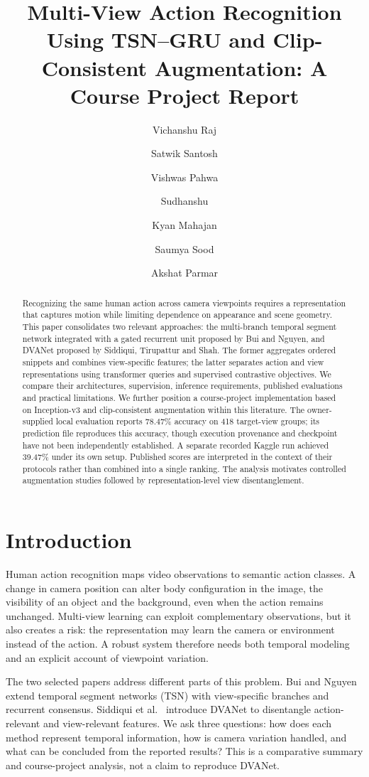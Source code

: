 \documentclass[runningheads]{llncs}
\title{Multi-View Action Recognition Using TSN--GRU and Clip-Consistent Augmentation: A Course Project Report}
\author{Vichanshu Raj \and Satwik Santosh \and Vishwas Pahwa \and Sudhanshu \and Kyan Mahajan \and Saumya Sood \and Akshat Parmar}
\institute{Image and Video Processing Course Project, Group 19}
\begin{document}
\maketitle
\begin{abstract}
Recognizing the same human action across camera viewpoints requires a representation that captures motion while limiting dependence on appearance and scene geometry. This paper consolidates two relevant approaches: the multi-branch temporal segment network integrated with a gated recurrent unit proposed by Bui and Nguyen, and DVANet proposed by Siddiqui, Tirupattur and Shah. The former aggregates ordered snippets and combines view-specific features; the latter separates action and view representations using transformer queries and supervised contrastive objectives. We compare their architectures, supervision, inference requirements, published evaluations and practical limitations. We further position a course-project implementation based on Inception-v3 and clip-consistent augmentation within this literature. The owner-supplied local evaluation reports 78.47\% accuracy on 418 target-view groups; its prediction file reproduces this accuracy, though execution provenance and checkpoint have not been independently established. A separate recorded Kaggle run achieved 39.47\% under its own setup. Published scores are interpreted in the context of their protocols rather than combined into a single ranking. The analysis motivates controlled augmentation studies followed by representation-level view disentanglement.
\end{abstract}

\section{Introduction}
Human action recognition maps video observations to semantic action classes. A change in camera position can alter body configuration in the image, the visibility of an object and the background, even when the action remains unchanged. Multi-view learning can exploit complementary observations, but it also creates a risk: the representation may learn the camera or environment instead of the action. A robust system therefore needs both temporal modeling and an explicit account of viewpoint variation.

The two selected papers address different parts of this problem. Bui and Nguyen~\cite{bui} extend temporal segment networks (TSN) with view-specific branches and recurrent consensus. Siddiqui et al.~\cite{dva} introduce DVANet to disentangle action-relevant and view-relevant features. We ask three questions: how does each method represent temporal information, how is camera variation handled, and what can be concluded from the reported results? This is a comparative summary and course-project analysis, not a claim to reproduce DVANet.
\end{document}
